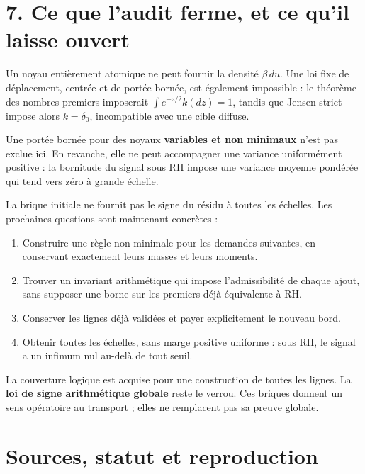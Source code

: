 \documentclass[
  10pt,
  a4paper,
]{article}
\providecommand{\tightlist}{%
  \setlength{\itemsep}{0pt}\setlength{\parskip}{0pt}}
\begin{document}
\hypertarget{ce-que-laudit-ferme-et-ce-quil-laisse-ouvert}{%
\section{7. Ce que l'audit ferme, et ce qu'il laisse
ouvert}\label{ce-que-laudit-ferme-et-ce-quil-laisse-ouvert}}

Un noyau entièrement atomique ne peut fournir la densité \(\beta\,du\).
Une loi fixe de déplacement, centrée et de portée bornée, est également
impossible : le théorème des nombres premiers imposerait
\(\int e^{-z/2}k(dz)=1\), tandis que Jensen strict impose alors
\(k=\delta_0\), incompatible avec une cible diffuse.

Une portée bornée pour des noyaux \textbf{variables et non minimaux}
n'est pas exclue ici. En revanche, elle ne peut accompagner une variance
uniformément positive : la bornitude du signal sous RH impose une
variance moyenne pondérée qui tend vers zéro à grande échelle.

La brique initiale ne fournit pas le signe du résidu à toutes les
échelles. Les prochaines questions sont maintenant concrètes :

\begin{enumerate}
\def\labelenumi{\arabic{enumi}.}
\tightlist
\item
  Construire une règle non minimale pour les demandes suivantes, en
  conservant exactement leurs masses et leurs moments.
\item
  Trouver un invariant arithmétique qui impose l'admissibilité de chaque
  ajout, sans supposer une borne sur les premiers déjà équivalente à RH.
\item
  Conserver les lignes déjà validées et payer explicitement le nouveau
  bord.
\item
  Obtenir toutes les échelles, sans marge positive uniforme : sous RH,
  le signal a un infimum nul au-delà de tout seuil.
\end{enumerate}

La couverture logique est acquise pour une construction de toutes les
lignes. La \textbf{loi de signe arithmétique globale} reste le verrou.
Ces briques donnent un sens opératoire au transport ; elles ne
remplacent pas sa preuve globale.

\newpage

\hypertarget{sources-statut-et-reproduction}{%
\section{Sources, statut et
reproduction}\label{sources-statut-et-reproduction}}
\end{document}
